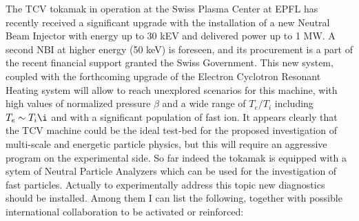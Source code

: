 \documentclass[12pt,a4paper]{article}
\begin{document}
The TCV tokamak in operation at the Swiss Plasma Center at EPFL has 
recently received a significant upgrade with the installation of a new Neutral Beam
Injector with energy up to 30 kEV and delivered power up to 1 MW. A
second NBI at higher energy (50 keV) is foreseen, and its procurement
is a part of the recent financial  support granted the Swiss Government. This
new system, coupled with the forthcoming upgrade of the Electron
Cyclotron Resonant Heating system will allow to reach unexplored
scenarios for this machine, with high values of normalized pressure $\beta$ and a wide range of
$T_e/T_i$ including $T_e\sim T_i\i$ and with a significant population
of fast ion. It appears clearly that the TCV machine could be the
ideal test-bed for the proposed investigation of multi-scale and
energetic particle physics, but this will require an aggressive
program on the 
experimental side. 
So far indeed the tokamak is equipped with a sytem of 
Neutral Particle Analyzers which can be used for the
investigation of fast particles. Actually to experimentally address
this topic new diagnostics should be installed. Among them I can list the
following, together with possible international collaboration to be activated or reinforced:
\end{document}
